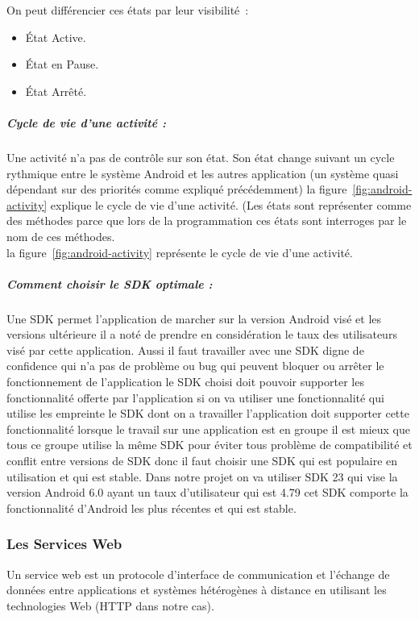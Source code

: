 On peut différencier ces états par leur visibilité :
\begin{itemize}
 \item État Active.
 \item État en Pause.
 \item État Arrêté.
\end{itemize}

\subparagraph{Cycle de vie d'une activité :}

Une activité n'a pas de contrôle sur son état.  Son état change suivant un
cycle rythmique entre le système Android et les autres application (un système
quasi dépendant sur des priorités comme expliqué précédemment) la
figure~\ref{fig:android-activity} explique le cycle de vie d'une activité. (Les
états sont représenter comme des méthodes parce que lors de la programmation
ces états sont interroges par le nom de ces méthodes.\\ la
figure~\ref{fig:android-activity} représente le cycle de vie d'une activité.



\subparagraph{Comment choisir le SDK optimale :}

Une SDK permet l'application de marcher sur la version Android visé et les
versions ultérieure il a noté de prendre en considération le taux des
utilisateurs visé par cette application. Aussi il faut travailler avec une SDK
digne de confidence qui n'a pas de problème ou bug qui peuvent bloquer ou
arrêter le fonctionnement de l'application le SDK choisi doit pouvoir supporter
les fonctionnalité offerte par l'application si on va utiliser une
fonctionnalité qui utilise les empreinte le SDK dont on a travailler
l'application doit supporter cette fonctionnalité lorsque le travail sur une
application est en groupe il est mieux que tous ce groupe utilise la même SDK
pour éviter tous problème de compatibilité et conflit entre versions de SDK
donc il faut choisir une SDK qui est populaire en utilisation et qui est
stable. Dans notre projet on va utiliser SDK 23 qui vise la version Android 6.0
ayant un taux d'utilisateur qui est 4.79 %
cet SDK comporte la fonctionnalité d'Android les plus récentes et qui est
stable.

\subsubsection{Les Services Web}

Un service web est un protocole d'interface de communication et l'échange de
données entre applications et systèmes hétérogènes à distance en utilisant les
technologies Web (HTTP dans notre cas).

